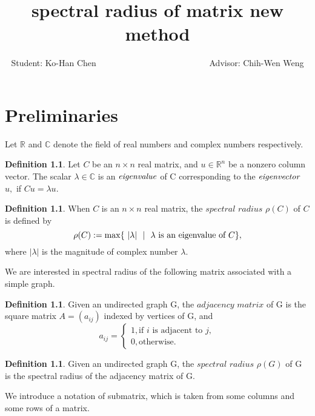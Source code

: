 \documentclass[12pt]{report}%
\title{spectral radius of matrix new method}
\author{Student: Ko-Han Chen  ~~~~~~~~~~~~~~~~~~~~~~~~~~Advisor: Chih-Wen Weng}
\date{} %
\theoremstyle{plain}
\theoremstyle{definition}
\newtheorem{defn}[thm]{Definition}
\begin{document}
\chapter{Preliminaries}

Let $\mathbb{R}$ and $\mathbb{C}$ denote the field of real numbers and complex numbers respectively.


\begin{defn}
    Let $C$ be an $n \times n$ real matrix, and $u \in \mathbb{R}^n$ be a nonzero column vector. The scalar $\lambda \in \mathbb{C}$ is an $\it{eigenvalue}$ of C corresponding to the $\it{eigenvector}$ $u,$  if $Cu = \lambda u.$
   
\end{defn}

\begin{defn}

When $C$ is an $n \times n$ real matrix, the $\textit {spectral radius} $ $\rho(C)$ of $C$ is defined by
$$\rho(C):=\max\{~|\lambda|~\ |~~\lambda\hbox{ is an eigenvalue of $C$}\},$$
where $|\lambda|$ is the magnitude of complex number $\lambda.$
\end{defn}

We are interested in spectral radius of the following matrix associated with a simple graph.

\begin{defn} Given an undirected graph
G, the$\textit{ adjacency matrix}$ of G is the square matrix $A = (a_{ij})$ indexed by vertices of G,
and
\[a_{ij} =\begin{cases}
1, \text{if $i$ is adjacent to $j$}, \\
0, \text{otherwise.}
\end{cases}
\]

\end{defn}

\begin{defn}
Given an undirected graph G, the $\textit{spectral radius}$  $\rho(G) $ of G is the spectral radius of the adjacency matrix of G.
\end{defn}



    We introduce a notation of submatrix, which is taken from some columns and some rows of a matrix.
\end{document}
